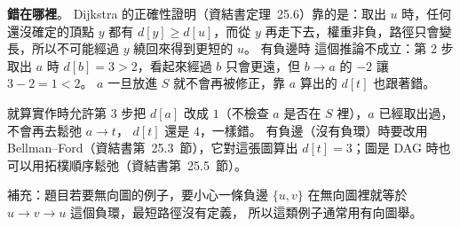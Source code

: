 \begin{pastsoln}
\textbf{錯在哪裡}。 Dijkstra 的正確性證明（資結書定理~25.6）靠的是：取出 $u$ 時，任何還沒確定的頂點 $y$ 都有
$d[y] \ge d[u]$，而從 $y$ 再走下去，權重非負，路徑只會變長，所以不可能經過 $y$ 繞回來得到更短的 $u$。 有負邊時
這個推論不成立：第 2 步取出 $a$ 時 $d[b] = 3 > 2$，看起來經過 $b$ 只會更遠，但 $b \to a$ 的 $-2$ 讓 $3 - 2 = 1 < 2$。
$a$ 一旦放進 $S$ 就不會再被修正，靠 $a$ 算出的 $d[t]$ 也跟著錯。

就算實作時允許第 3 步把 $d[a]$ 改成 $1$（不檢查 $a$ 是否在 $S$ 裡），$a$ 已經取出過，不會再去鬆弛 $a \to t$，
$d[t]$ 還是 $4$，一樣錯。 有負邊（沒有負環）時要改用 Bellman--Ford（資結書第~25.3~節），它對這張圖算出
$d[t] = 3$；圖是 DAG 時也可以用拓樸順序鬆弛（資結書第~25.5~節）。

補充：題目若要無向圖的例子，要小心一條負邊 $\{u, v\}$ 在無向圖裡就等於 $u \to v \to u$ 這個負環，最短路徑沒有定義，
所以這類例子通常用有向圖舉。
\end{pastsoln}

